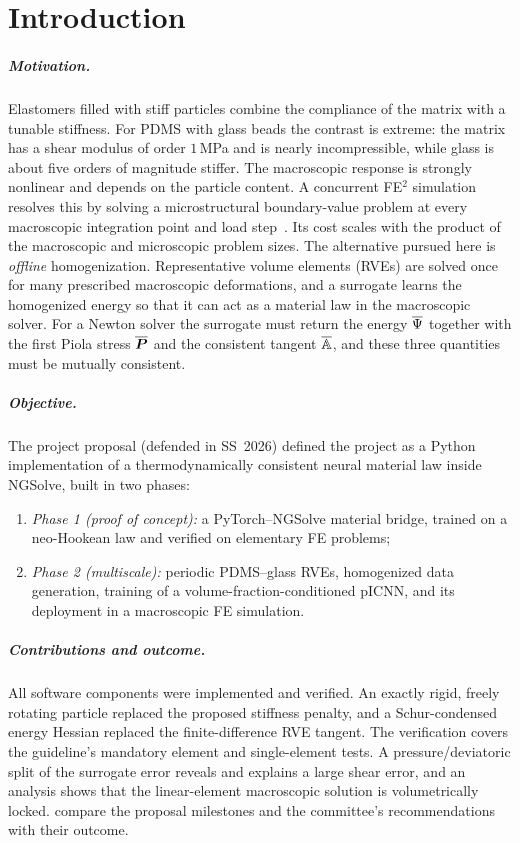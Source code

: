 \chapter{Introduction}\label{ch:intro}

\paragraph{Motivation.} Elastomers filled with stiff particles combine
the compliance of the matrix with a tunable stiffness. For PDMS with glass
beads the contrast is extreme: the matrix has a shear modulus of order
$1\,$MPa and is nearly incompressible, while glass is about five orders of
magnitude stiffer. The macroscopic response is strongly nonlinear and depends
on the particle content. A concurrent FE$^2$ simulation resolves this by
solving a microstructural boundary-value problem at every macroscopic
integration point and load step~\cite{Kouznetsova2001,Miehe2002}. Its cost scales with the product of the macroscopic and microscopic problem
sizes. The alternative pursued here is
\emph{offline} homogenization. Representative volume elements (RVEs) are solved
once for many prescribed macroscopic deformations, and a surrogate learns the
homogenized energy so that it can act as a material law in the macroscopic
solver. For a Newton solver the surrogate must return the energy $\overline{\Psi}$
together with the first Piola stress $\overline{\bm P}$ and the consistent tangent $\overline{\mathbb A}$,
and these three quantities must be mutually consistent.

\paragraph{Objective.} The project proposal (defended in SS~2026) defined the project as a
Python implementation of a thermodynamically consistent neural material law
inside NGSolve, built in two phases:
\begin{enumerate}
  \item \emph{Phase 1 (proof of concept):} a PyTorch--NGSolve material
        bridge, trained on a neo-Hookean law and verified on elementary FE problems;
  \item \emph{Phase 2 (multiscale):} periodic PDMS--glass RVEs,
        homogenized data generation, training of a volume-fraction-conditioned
        pICNN, and its deployment in a macroscopic FE simulation.
\end{enumerate}

\paragraph{Contributions and outcome.} All software components were
implemented and verified. An exactly rigid, freely rotating particle replaced the
proposed stiffness penalty, and a Schur-condensed energy Hessian replaced the
finite-difference RVE tangent. The verification covers the guideline's mandatory
element and single-element tests. A pressure/deviatoric split of the surrogate error
reveals and explains a large shear error, and an analysis shows that the
linear-element macroscopic solution is volumetrically locked.
 compare the proposal milestones and the
committee's recommendations with their outcome.

